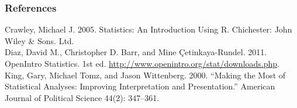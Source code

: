 \documentclass{beamer}\usepackage{graphicx, color}
\begin{document}

\begin{frame}[allowframebreaks]
  \frametitle{References}
  Crawley, Michael J. 2005. Statistics: An Introduction Using R. Chichester: John Wiley \& Sons. Ltd. \\[0.25cm]
  Diaz, David M., Christopher D. Barr, and Mine \c{C}etinkaya-Rundel. 2011. OpenIntro 
  Statistics. 1st ed. \url{http://www.openintro.org/stat/downloads.php}. \\[0.25cm] 
  King, Gary, Michael Tomz, and Jason Wittenberg. 2000. “Making the Most of Statistical Analyses: Improving Interpretation and Presentation.” American Journal of Political Science 44(2): 347–361.
\end{frame}
\end{document}
